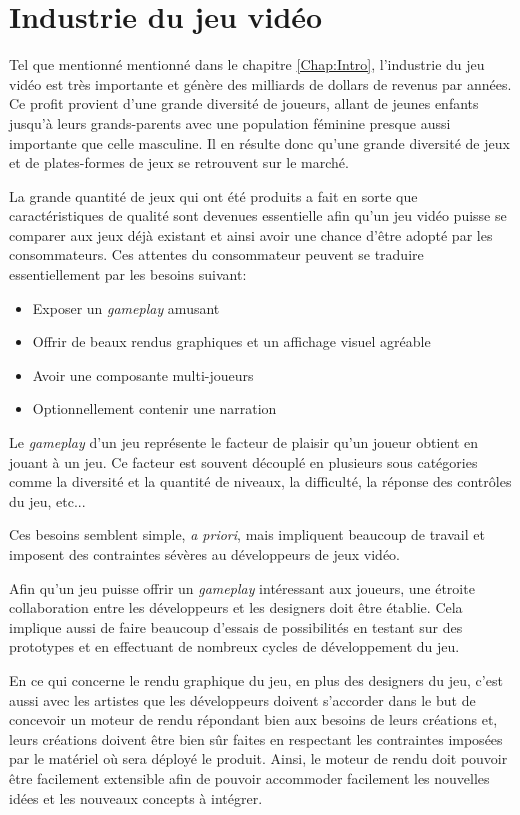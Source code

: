 \documentclass[12pt,twoside,letterpaper,francais]{book}
\begin{document}
\FloatBarrier
\section{Industrie du jeu vidéo}
Tel que mentionné mentionné dans le chapitre \ref{Chap:Intro},
l'industrie du jeu vidéo est très importante et génère des milliards
de dollars de revenus par années. Ce profit provient d'une grande
diversité de joueurs, allant de jeunes enfants jusqu'à leurs
grands-parents avec une population féminine presque aussi importante
que celle masculine. Il en résulte donc qu'une grande diversité de
jeux et de plates-formes de jeux se retrouvent sur le marché.

La grande quantité de jeux qui ont été produits a fait en sorte que
caractéristiques de qualité sont devenues essentielle afin qu'un jeu
vidéo puisse se comparer aux jeux déjà existant et ainsi avoir une
chance d'être adopté par les consommateurs. Ces attentes du
consommateur peuvent se traduire essentiellement par les besoins
suivant:

\begin{itemize}
\item Exposer un \textit{gameplay} amusant
\item Offrir de beaux rendus graphiques et un affichage visuel
  agréable
\item Avoir une composante multi-joueurs
\item Optionnellement contenir une narration 
\end{itemize}

Le \textit{gameplay} d'un jeu représente le facteur de plaisir qu'un
joueur obtient en jouant à un jeu. Ce facteur est souvent découplé en
plusieurs sous catégories comme la diversité et la quantité de
niveaux, la difficulté, la réponse des contrôles du jeu, etc...

Ces besoins semblent simple, \textit{a priori}, mais impliquent
beaucoup de travail et imposent des contraintes sévères au
développeurs de jeux vidéo.

Afin qu'un jeu puisse offrir un \textit{gameplay} intéressant aux
joueurs, une étroite collaboration entre les développeurs et les
designers doit être établie. Cela implique aussi de faire beaucoup
d'essais de possibilités en testant sur des prototypes et en
effectuant de nombreux cycles de développement du jeu.

En ce qui concerne le rendu graphique du jeu, en plus des designers du
jeu, c'est aussi avec les artistes que les développeurs doivent
s'accorder dans le but de concevoir un moteur de rendu répondant bien
aux besoins de leurs créations et, leurs créations doivent être bien
sûr faites en respectant les contraintes imposées par le matériel où
sera déployé le produit. Ainsi, le moteur de rendu doit pouvoir être
facilement extensible afin de pouvoir accommoder facilement les
nouvelles idées et les nouveaux concepts à intégrer.
\end{document}
